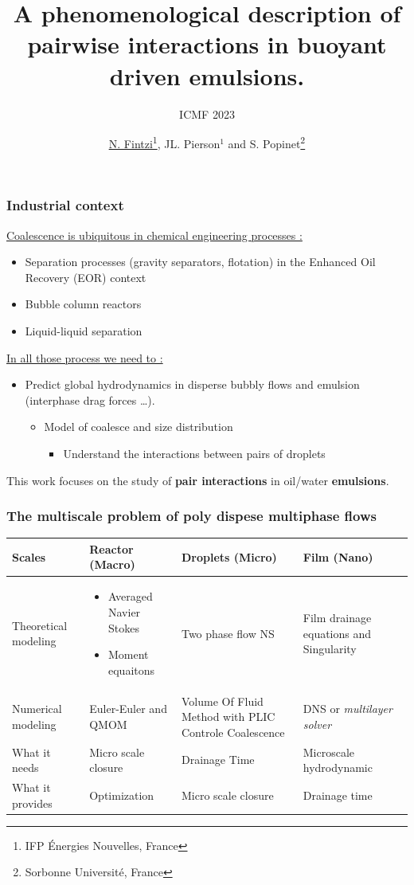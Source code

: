 \documentclass{sintefbeamer}
\title{A phenomenological description of pairwise interactions in buoyant driven emulsions.}
\subtitle{ICMF 2023}
\author{\href{http://basilisk.fr/sandbox/fintzin/Rising-Suspenion/RS.c}{\underline{N. Fintzi}\footnote{IFP \'Energies Nouvelles, France}, JL. Pierson$^1$} and S. Popinet\footnote{Sorbonne Universit\'e, France}}
\begin{document}
\maketitle

\begin{frame}
  \frametitle{Industrial context}
  \underline{Coalescence is ubiquitous in chemical engineering processes :}
  \begin{itemize}
    \item Separation processes (gravity separators, flotation) in the Enhanced Oil Recovery (EOR) context
    \item Bubble column reactors
    \item Liquid-liquid separation
  \end{itemize}
  \vfill
  \underline{In all those process we need to : }
  \begin{itemize}
    \item Predict global hydrodynamics in disperse bubbly flows and emulsion (interphase drag forces \ldots).
    \begin{itemize}
      \item Model of coalesce and size distribution 
      \begin{itemize}
        \item Understand the interactions between pairs of droplets
      \end{itemize}
    \end{itemize}
  \end{itemize}

  \vfill
  This work focuses on the study of \textbf{pair interactions} in oil/water \textbf{emulsions}.
\end{frame}

\begin{frame}
  \frametitle{The multiscale problem of poly dispese multiphase flows}
  \begin{tabular}{p{3cm}|p{3cm}|p{3cm}|p{3cm}}
    Scales & 
    Reactor (Macro) & 
    Droplets (Micro) & 
    Film (Nano) \\\hline
    Theoretical modeling & 
    \begin{itemize}
      \item Averaged Navier Stokes
      \item Moment equaitons
    \end{itemize}& \cellcolor[HTML]{AA0044}
    Two phase flow NS& 
    Film drainage equations and Singularity \\\hline
    Numerical modeling &
    Euler-Euler and QMOM &\cellcolor[HTML]{AA0044} 
     Volume Of Fluid Method with PLIC
     Controle Coalescence&
     DNS or \textit{multilayer solver}\\\hline
    What it needs &
     Micro scale closure&
     Drainage Time &
     Microscale hydrodynamic\\\hline
    What it provides & 
    Optimization & \cellcolor[HTML]{AA0044}
    Micro scale closure &
     Drainage time\\\hline
  \end{tabular}
\end{frame}
\end{document}
